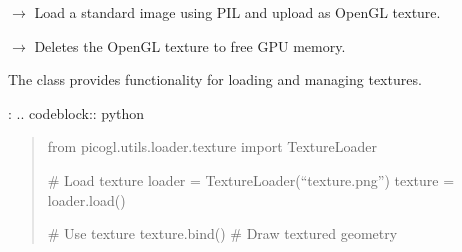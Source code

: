 \documentclass[a4paper,10pt,english,openany,oneside]{sphinxmanual}
\begin{document}
\begin{fulllineitems}
\begin{fulllineitems}
\end{fulllineitems}


\begin{fulllineitems}
\label{\detokenize{api/utils:picogl.utils.loader.texture.TextureLoader.load_by_pil}}
\pysigstartsignatures
\pysiglinewithargsret
{}
{\sphinxparamcomma {}}
{{ $\rightarrow$ }}
\pysigstopsignatures
\sphinxAtStartPar
Load a standard image using PIL and upload as OpenGL texture.

\end{fulllineitems}


\begin{fulllineitems}
\label{\detokenize{api/utils:picogl.utils.loader.texture.TextureLoader.delete}}
\pysigstartsignatures
\pysiglinewithargsret
{}
{}
{{ $\rightarrow$ }}
\pysigstopsignatures
\sphinxAtStartPar
Deletes the OpenGL texture to free GPU memory.

\end{fulllineitems}


\end{fulllineitems}


\sphinxAtStartPar
The  class provides functionality for loading and managing textures.

\sphinxAtStartPar
{}:
.. code\sphinxhyphen{}block:: python
\begin{quote}

\sphinxAtStartPar
from picogl.utils.loader.texture import TextureLoader

\sphinxAtStartPar
\# Load texture
loader = TextureLoader(“texture.png”)
texture = loader.load()

\sphinxAtStartPar
\# Use texture
texture.bind()
\# Draw textured geometry
\end{quote}
\end{document}
